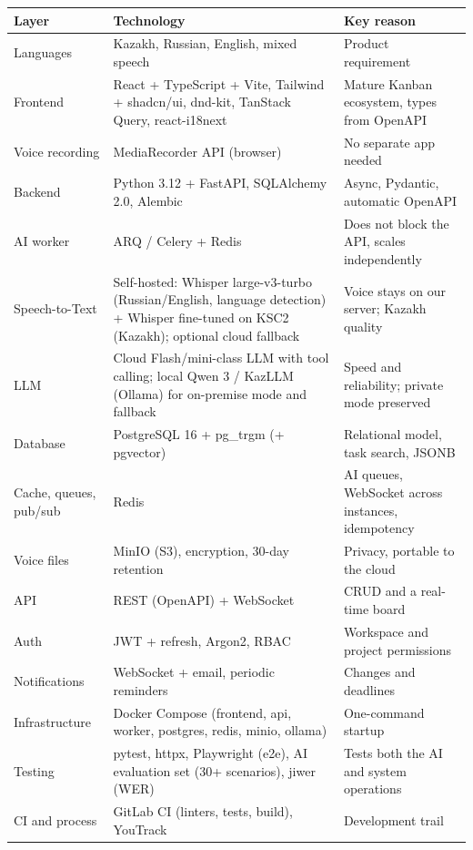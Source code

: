 \documentclass[11pt,a4paper]{article}
\newcommand{\tblstart}{\small\rowcolors{2}{gray!7}{white}}
\begin{document}
{\tblstart
\begin{xltabular}{\textwidth}{P{3.2cm} P{6.6cm} L}
\toprule
\textbf{Layer} & \textbf{Technology} & \textbf{Key reason} \\
\midrule
\endhead
Languages & Kazakh, Russian, English, mixed speech & Product requirement \\
Frontend & React + TypeScript + Vite, Tailwind + shadcn/ui, dnd-kit, TanStack Query, react-i18next & Mature Kanban ecosystem, types from OpenAPI \\
Voice recording & MediaRecorder API (browser) & No separate app needed \\
Backend & Python 3.12 + FastAPI, SQLAlchemy 2.0, Alembic & Async, Pydantic, automatic OpenAPI \\
AI worker & ARQ / Celery + Redis & Does not block the API, scales independently \\
Speech-to-Text & Self-hosted: Whisper large-v3-turbo (Russian/English, language detection) + Whisper fine-tuned on KSC2 (Kazakh); optional cloud fallback & Voice stays on our server; Kazakh quality \\
LLM & Cloud Flash/mini-class LLM with tool calling; local Qwen 3 / KazLLM (Ollama) for on-premise mode and fallback & Speed and reliability; private mode preserved \\
Database & PostgreSQL 16 + pg\_trgm (+ pgvector) & Relational model, task search, JSONB \\
Cache, queues, pub/sub & Redis & AI queues, WebSocket across instances, idempotency \\
Voice files & MinIO (S3), encryption, 30-day retention & Privacy, portable to the cloud \\
API & REST (OpenAPI) + WebSocket & CRUD and a real-time board \\
Auth & JWT + refresh, Argon2, RBAC & Workspace and project permissions \\
Notifications & WebSocket + email, periodic reminders & Changes and deadlines \\
Infrastructure & Docker Compose (frontend, api, worker, postgres, redis, minio, ollama) & One-command startup \\
Testing & pytest, httpx, Playwright (e2e), AI evaluation set (30+ scenarios), jiwer (WER) & Tests both the AI and system operations \\
CI and process & GitLab CI (linters, tests, build), YouTrack & Development trail \\
\bottomrule
\end{xltabular}}
\end{document}
